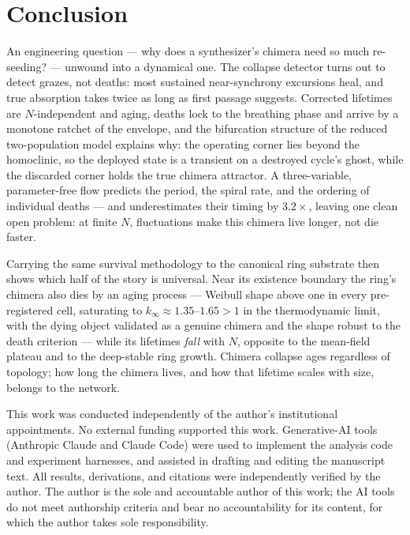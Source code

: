 \documentclass[pdflatex,sn-mathphys,Numbered]{sn-jnl}
\begin{document}
\section{Conclusion}\label{sec:conclusion}

An engineering question --- why does a synthesizer's chimera need so much
re-seeding? --- unwound into a dynamical one. The collapse detector turns out to
detect grazes, not deaths: most sustained near-synchrony excursions heal, and true
absorption takes twice as long as first passage suggests. Corrected lifetimes are
$N$-independent and aging, deaths lock to the breathing phase and arrive by a
monotone ratchet of the envelope, and the bifurcation structure of the reduced
two-population model explains why: the operating corner lies beyond the homoclinic,
so the deployed state is a transient on a destroyed cycle's ghost, while the
discarded corner holds the true chimera attractor. A three-variable, parameter-free
flow predicts the period, the spiral rate, and the ordering of individual deaths
--- and underestimates their timing by $3.2\times$, leaving one clean open problem:
at finite $N$, fluctuations make this chimera live longer, not die faster.

Carrying the same survival methodology to the canonical ring substrate then shows
which half of the story is universal. Near its existence boundary the ring's
chimera also dies by an aging process --- Weibull shape above one in every
pre-registered cell, saturating to $k_\infty \approx 1.35$--$1.65 > 1$ in the
thermodynamic limit, with the dying object validated as a genuine chimera and the
shape robust to the death criterion --- while its lifetimes \emph{fall} with $N$,
opposite to the mean-field plateau and to the deep-stable ring growth. Chimera
collapse ages regardless of topology; how long the chimera lives, and how that
lifetime scales with size, belongs to the network.

\backmatter

This work was conducted independently of the author's institutional appointments.
No external funding supported this work. Generative-AI tools (Anthropic Claude and
Claude Code) were used to implement the analysis code and experiment harnesses, and
assisted in drafting and editing the manuscript text. All results, derivations, and
citations were independently verified by the author. The author is the sole and
accountable author of this work; the AI tools do not meet authorship criteria and
bear no accountability for its content, for which the author takes sole
responsibility.
\end{document}
